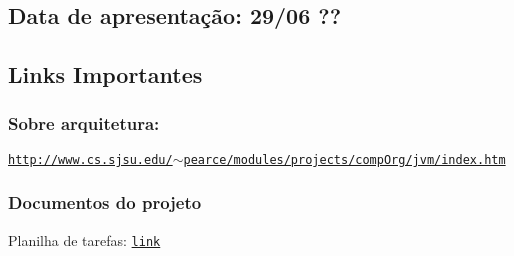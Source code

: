 \subsection*{Data de apresentação\+: 29/06 ??}

\subsection*{Links Importantes}

\subsubsection*{Sobre arquitetura\+:}


\begin{DoxyItemize}
\item \href{http://www.cs.sjsu.edu/~pearce/modules/projects/compOrg/jvm/index.htm}{\tt http\+://www.\+cs.\+sjsu.\+edu/$\sim$pearce/modules/projects/comp\+Org/jvm/index.\+htm} \subsubsection*{Documentos do projeto}
\end{DoxyItemize}


\begin{DoxyItemize}
\item Planilha de tarefas\+: \href{https://docs.google.com/spreadsheets/d/1gl0El75BLyt6EhjdpEbW3lL2EOfX6Bua7T53h9XV7P4/edit?usp=sharing}{\tt link} 
\end{DoxyItemize}